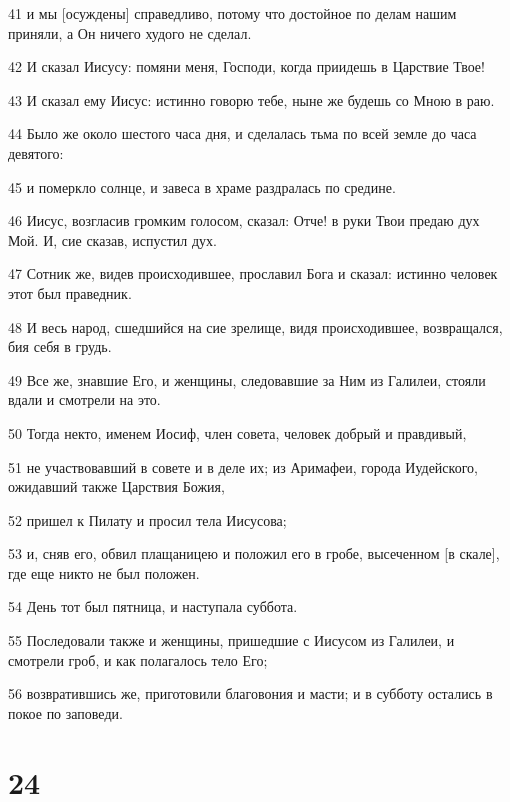 \par 41 и мы [осуждены] справедливо, потому что достойное по делам нашим приняли, а Он ничего худого не сделал.
\par 42 И сказал Иисусу: помяни меня, Господи, когда приидешь в Царствие Твое!
\par 43 И сказал ему Иисус: истинно говорю тебе, ныне же будешь со Мною в раю.
\par 44 Было же около шестого часа дня, и сделалась тьма по всей земле до часа девятого:
\par 45 и померкло солнце, и завеса в храме раздралась по средине.
\par 46 Иисус, возгласив громким голосом, сказал: Отче! в руки Твои предаю дух Мой. И, сие сказав, испустил дух.
\par 47 Сотник же, видев происходившее, прославил Бога и сказал: истинно человек этот был праведник.
\par 48 И весь народ, сшедшийся на сие зрелище, видя происходившее, возвращался, бия себя в грудь.
\par 49 Все же, знавшие Его, и женщины, следовавшие за Ним из Галилеи, стояли вдали и смотрели на это.
\par 50 Тогда некто, именем Иосиф, член совета, человек добрый и правдивый,
\par 51 не участвовавший в совете и в деле их; из Аримафеи, города Иудейского, ожидавший также Царствия Божия,
\par 52 пришел к Пилату и просил тела Иисусова;
\par 53 и, сняв его, обвил плащаницею и положил его в гробе, высеченном [в скале], где еще никто не был положен.
\par 54 День тот был пятница, и наступала суббота.
\par 55 Последовали также и женщины, пришедшие с Иисусом из Галилеи, и смотрели гроб, и как полагалось тело Его;
\par 56 возвратившись же, приготовили благовония и масти; и в субботу остались в покое по заповеди.

\chapter{24}

